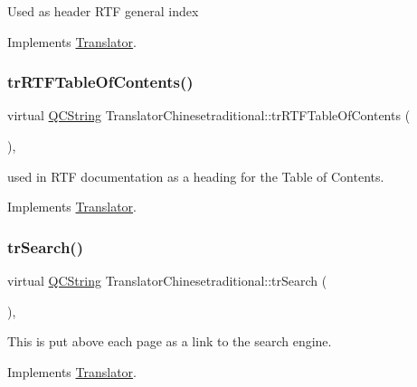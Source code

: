 Used as header R\+TF general index 

Implements \mbox{\hyperlink{class_translator}{Translator}}.

\mbox{\label{class_translator_chinesetraditional_afa9fb73edd1669644f8631c983d94913}} 
\subsubsection{\texorpdfstring{trRTFTableOfContents()}{trRTFTableOfContents()}}
{\footnotesize\ttfamily virtual \mbox{\hyperlink{class_q_c_string}{Q\+C\+String}} Translator\+Chinesetraditional\+::tr\+R\+T\+F\+Table\+Of\+Contents (\begin{DoxyParamCaption}{ }\end{DoxyParamCaption})\hspace{0.3cm}{\ttfamily [inline]}, {\ttfamily [virtual]}}

used in R\+TF documentation as a heading for the Table of Contents. 

Implements \mbox{\hyperlink{class_translator}{Translator}}.

\mbox{\label{class_translator_chinesetraditional_ae3af377f58ca738dfeb56712ab26bf7f}} 
\subsubsection{\texorpdfstring{trSearch()}{trSearch()}}
{\footnotesize\ttfamily virtual \mbox{\hyperlink{class_q_c_string}{Q\+C\+String}} Translator\+Chinesetraditional\+::tr\+Search (\begin{DoxyParamCaption}{ }\end{DoxyParamCaption})\hspace{0.3cm}{\ttfamily [inline]}, {\ttfamily [virtual]}}

This is put above each page as a link to the search engine. 

Implements \mbox{\hyperlink{class_translator}{Translator}}.

